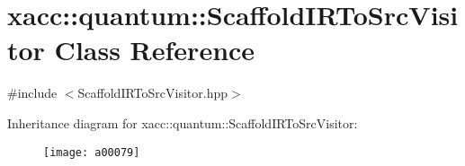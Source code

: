 \hypertarget{a00079}{}\section{xacc\+:\+:quantum\+:\+:Scaffold\+I\+R\+To\+Src\+Visitor Class Reference}
\label{a00079}


{\ttfamily \#include $<$Scaffold\+I\+R\+To\+Src\+Visitor.\+hpp$>$}

Inheritance diagram for xacc\+:\+:quantum\+:\+:Scaffold\+I\+R\+To\+Src\+Visitor\+:\begin{figure}[H]
\begin{center}
\leavevmode
\texttt{[image: a00079]}
\end{center}
\end{figure}
